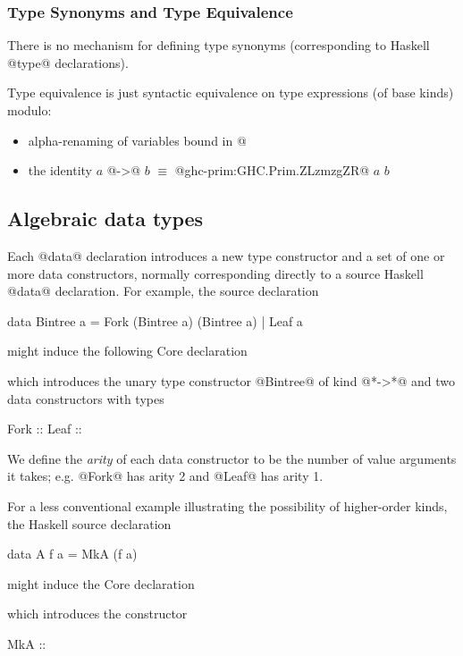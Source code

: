 \documentclass[10pt]{article}
\begin{document}
\subsubsection{Type Synonyms and Type Equivalence}
There is no mechanism for defining type synonyms (corresponding to
Haskell @type@ declarations).

Type equivalence is just syntactic equivalence on type expressions
(of base kinds) modulo:

\begin{itemize} 
\item alpha-renaming of variables bound in @%
\item the identity $a$ @->@ $b$ $\equiv$ @ghc-prim:GHC.Prim.ZLzmzgZR@ $a$ $b$
\end{itemize}

\subsection{Algebraic data types}

Each @data@ declaration introduces a new type constructor and a set of one or
more data constructors, normally corresponding directly to a source Haskell @data@ declaration.
For example, the source declaration
\begin{code}
data Bintree a =
   Fork (Bintree a) (Bintree a)
|  Leaf a
\end{code}
might induce the following Core declaration
which introduces the unary type constructor @Bintree@ of kind @*->*@  and two data constructors with types
\begin{code}
Fork :: %
Leaf :: %
\end{code}
We define the {\it arity} of each data constructor to be the number of value arguments it takes;
e.g. @Fork@ has arity 2 and @Leaf@ has arity 1.

For a less conventional example illustrating the possibility of higher-order kinds, the Haskell source declaration
\begin{code}
data A f a = MkA (f a)
\end{code}
might induce the Core declaration
\begin{code}
\end{code}
which introduces the constructor
\begin{code}
MkA :: %
\end{code}
\end{document}
